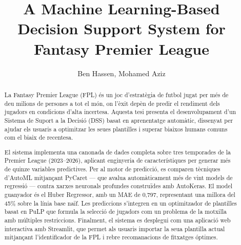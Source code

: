 \documentclass[11pt,english,listoffigures,listoftables]{tfgetsinf}
\title{A Machine Learning-Based Decision Support System for Fantasy Premier League}
\author{Ben Hassen, Mohamed Aziz}
\begin{document}

\begin{abstract}
La Fantasy Premier League (FPL) \'{e}s un joc d'estrat\`{e}gia de futbol jugat per m\'{e}s de deu milions de persones a tot el m\'{o}n, on l'\`{e}xit dep\`{e}n de predir el rendiment dels jugadors en condicions d'alta incertesa. Aquesta tesi presenta el desenvolupament d'un Sistema de Suport a la Decisi\'{o} (DSS) basat en aprenentatge autom\`{a}tic, dissenyat per ajudar els usuaris a optimitzar les seues plantilles i superar biaixos humans comuns com el biaix de recentesa.

El sistema implementa una canonada de dades completa sobre tres temporades de la Premier League (2023--2026), aplicant enginyeria de caracter\'{i}stiques per generar m\'{e}s de quinze variables predictives. Per al motor de predicci\'{o}, es comparen t\`{e}cniques d'AutoML mitjan\c{c}ant PyCaret --- que avalua autom\`{a}ticament m\'{e}s de vint models de regressi\'{o} --- contra xarxes neuronals profundes construïdes amb AutoKeras. El model guanyador \'{e}s el Huber Regressor, amb un MAE de 0,797, representant una millora del 45\% sobre la l\'{i}nia base na\"{i}f. Les prediccions s'integren en un optimitzador de plantilles basat en PuLP que formula la selecci\'{o} de jugadors com un problema de la motxilla amb m\'{u}ltiples restriccions. Finalment, el sistema es desplegui com una aplicaci\'{o} web interactiva amb Streamlit, que permet als usuaris importar la seua plantilla actual mitjan\c{c}ant l'identificador de la FPL i rebre recomanacions de fitxatges \'{o}ptimes.
\end{abstract}
\end{document}
